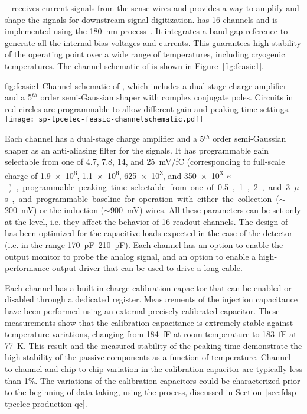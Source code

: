 ~\cite{DeGeronimo:2011zz} receives 
current signals from the  sense wires and provides a way to 
amplify and shape the signals for downstream signal digitization. 
 has \num{16} channels and is implemented 
using the  \SI{180}{nm}  process~\cite{TSMC180}. It 
integrates a band-gap reference to generate all the internal bias 
voltages and currents. This guarantees high stability of the operating 
point over a wide range of temperatures, including cryogenic temperatures. 
The channel schematic of  is shown in 
Figure~\ref{fig:feasic1}. 

\begin{dunefigure}
{fig:feasic1}
{Channel schematic of , which includes a 
dual-stage charge amplifier and a \num{5}$^{th}$ order semi-Gaussian 
shaper with complex conjugate poles. Circuits in red circles are 
programmable to allow different gain and peaking time settings.}
\texttt{[image: sp-tpcelec-feasic-channelschematic.pdf]}
\end{dunefigure}

Each  channel has a dual-stage charge amplifier 
and a \num{5}$^{th}$ order semi-Gaussian shaper as an anti-aliasing 
filter for the  signals. It has programmable gain 
selectable from one of \num{4.7}, \num{7.8}, \num{14}, and \SI{25}{mV/fC}
(corresponding to full-scale charge of \num{1.9e6}, \num{1.1e6}, \num{625e3}, 
and \SI{350e3}{$e^-$}), programmable peaking time selectable from one of 
\num{0.5}, \num{1}, \num{2}, and \SI{3}{$\mu$s}, and programmable 
baseline for operation with either the collection ($\sim$\SI{200}{mV}) 
or the induction ($\sim$\SI{900}{mV}) wires. All these parameters
can be set only at the  level, i.e. they affect the
behavior of \num{16} readout channels.
The design of
 has been optimized for the capacitive
loads expected in the case of the  detector
(i.e. in the range \SIrange{170}{210}{pF}).
Each channel has an 
option to enable the output monitor to probe the analog signal, and 
an option to enable a high-performance output driver that can be 
used to drive a long cable. 

Each  channel has a built-in charge calibration 
capacitor that can be enabled or disabled through a dedicated register. 
Measurements of the injection capacitance have been performed using an 
external precisely calibrated capacitor. These measurements show that
the calibration capacitance is extremely stable against temperature variations, 
changing from \SI{184}{fF} at room temperature to 
\SI{183}{fF} at \SI{77}{K}. This result and the measured stability of 
the peaking time demonstrate the high stability of the passive 
components as a function of temperature. Channel-to-channel and 
chip-to-chip variation in the calibration capacitor are typically 
less than \num{1}\%. The variations of the calibration capacitors
could be characterized prior to the beginning of 
data taking, using the  process, discussed in
Section~\ref{sec:fdsp-tpcelec-production-qc}.

